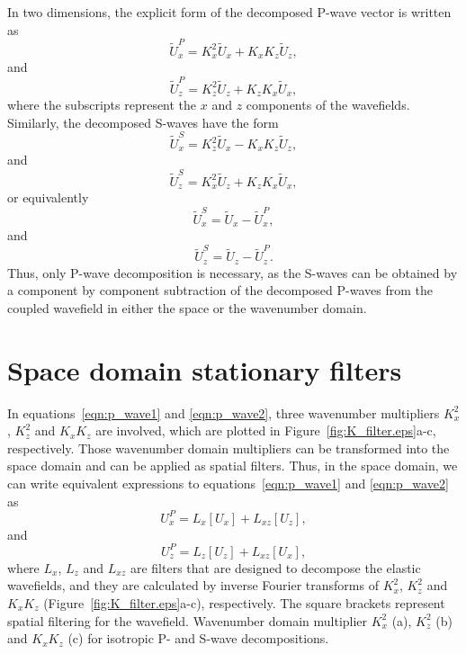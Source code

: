 \documentclass[manuscript,ulem,graphix,revised]{geophysics}
\begin{document}
In two dimensions, the explicit form of the decomposed P-wave vector is written as
\begin{equation}
\tilde{U}^P_x = K^2_x \tilde{U}_x + K_x K_z \tilde{U}_z,
\label{eqn:p_wave1}
\end{equation}
and 
\begin{equation}
\tilde{U}^P_z = K^2_z \tilde{U}_z + K_z K_x \tilde{U}_x,
\label{eqn:p_wave2}
\end{equation}
where the subscripts represent the $x$ and $z$ components of the wavefields. Similarly, the decomposed S-waves have the form
\begin{equation}
\tilde{U}^S_x = K^2_z \tilde{U}_x - K_x K_z \tilde{U}_z,
\label{eqn:s_wave1}
\end{equation}
and 
\begin{equation}
\tilde{U}^S_z = K^2_x \tilde{U}_z + K_z K_x \tilde{U}_x,
\label{eqn:s_wave2}
\end{equation}
or equivalently
\begin{equation}
\tilde{U}^S_x = \tilde{U}_x - \tilde{U}^P_x,
\label{eqn:s_wave3}
\end{equation}
and 
\begin{equation}
\tilde{U}^S_z = \tilde{U}_z - \tilde{U}^P_z.
\label{eqn:s_wave4}
\end{equation}
Thus, only P-wave decomposition is necessary, as the S-waves can be obtained by a component by component subtraction of the decomposed P-waves from the coupled wavefield in either the space or the wavenumber domain.

\section{Space domain stationary filters}

In equations~\ref{eqn:p_wave1} and \ref{eqn:p_wave2}, three wavenumber multipliers $K^2_x$, $K^2_z$ and $K_xK_z$ are involved, which are plotted in Figure~\ref{fig:K_filter.eps}a-c, respectively. 
Those wavenumber domain multipliers can be transformed into the space domain and can be applied as spatial filters. Thus, in the space domain, we can write equivalent expressions to equations~\ref{eqn:p_wave1} and \ref{eqn:p_wave2} as
\begin{equation}
U^P_x = L_x [U_x] + L_{xz} [U_z],
\label{eqn:p_space1}
\end{equation}
and 
\begin{equation}
U^P_z = L_z [U_z] + L_{xz} [U_x],
\label{eqn:p_space2}
\end{equation}
where $L_x$, $L_z$ and $L_{xz}$ are filters that are designed to decompose the elastic wavefields, and they are calculated by inverse Fourier transforms of $K^2_x$, $K^2_z$ and $K_xK_z$ (Figure~\ref{fig:K_filter.eps}a-c), respectively. 
The square brackets represent spatial filtering for the wavefield. 
{
Wavenumber domain multiplier $K^2_x$ (a), $K^2_z$ (b) and $K_xK_z$ (c) for isotropic P- and S-wave decompositions.
}
\end{document}
